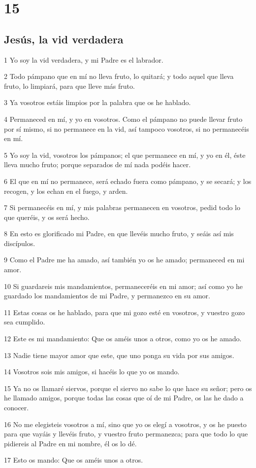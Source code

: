 \chapter{15}

\section*{Jesús, la vid verdadera}

\par 1 Yo soy la vid verdadera, y mi Padre es el labrador.
\par 2 Todo pámpano que en mí no lleva fruto, lo quitará; y todo aquel que lleva fruto, lo limpiará, para que lleve más fruto.
\par 3 Ya vosotros estáis limpios por la palabra que os he hablado.
\par 4 Permaneced en mí, y yo en vosotros. Como el pámpano no puede llevar fruto por sí mismo, si no permanece en la vid, así tampoco vosotros, si no permanecéis en mí.
\par 5 Yo soy la vid, vosotros los pámpanos; el que permanece en mí, y yo en él, éste lleva mucho fruto; porque separados de mí nada podéis hacer.
\par 6 El que en mí no permanece, será echado fuera como pámpano, y se secará; y los recogen, y los echan en el fuego, y arden.
\par 7 Si permanecéis en mí, y mis palabras permanecen en vosotros, pedid todo lo que queréis, y os será hecho.
\par 8 En esto es glorificado mi Padre, en que llevéis mucho fruto, y seáis así mis discípulos.
\par 9 Como el Padre me ha amado, así también yo os he amado; permaneced en mi amor.
\par 10 Si guardareis mis mandamientos, permaneceréis en mi amor; así como yo he guardado los mandamientos de mi Padre, y permanezco en su amor.
\par 11 Estas cosas os he hablado, para que mi gozo esté en vosotros, y vuestro gozo sea cumplido.
\par 12 Este es mi mandamiento: Que os améis unos a otros, como yo os he amado.
\par 13 Nadie tiene mayor amor que este, que uno ponga su vida por sus amigos.
\par 14 Vosotros sois mis amigos, si hacéis lo que yo os mando.
\par 15 Ya no os llamaré siervos, porque el siervo no sabe lo que hace su señor; pero os he llamado amigos, porque todas las cosas que oí de mi Padre, os las he dado a conocer.
\par 16 No me elegisteis vosotros a mí, sino que yo os elegí a vosotros, y os he puesto para que vayáis y llevéis fruto, y vuestro fruto permanezca; para que todo lo que pidiereis al Padre en mi nombre, él os lo dé.
\par 17 Esto os mando: Que os améis unos a otros.

